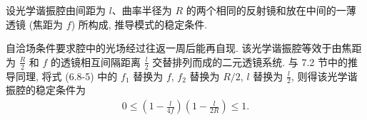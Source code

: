 \documentclass[twoside]{note}
\begin{document}
\begin{exe}
    设光学谐振腔由间距为 $l$、曲率半径为 $R$ 的两个相同的反射镜和放在中间的一薄透镜 (焦距为 $f$) 所构成, 推导模式的稳定条件.
\end{exe}
\begin{sol}
    自洽场条件要求腔中的光场经过往返一周后能再自现. 该光学谐振腔等效于由焦距为 $\frac{R}{2}$ 和 $f$ 的透镜相互间隔距离 $\frac{l}{2}$ 交替排列而成的二元透镜系统.
    与 7.2 节中的推导同理, 将式 (6.8-5) 中的 $f_1$ 替换为 $f$, $f_2$ 替换为 $R/2$, $l$ 替换为 $\frac{l}{2}$, 则得该光学谐振腔的稳定条件为
    \begin{align}
        0\leq\left(1-\frac{l}{4f}\right)\left(1-\frac{l}{2R}\right)\leq 1.
    \end{align}
\end{sol}
\end{document}
